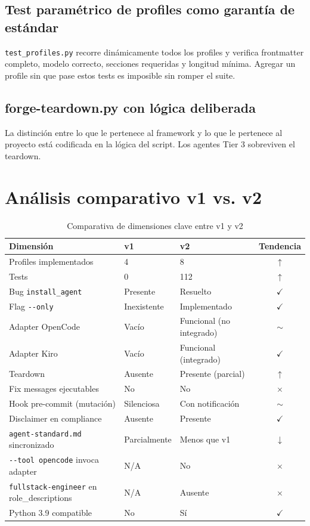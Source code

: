 \documentclass[12pt,a4paper]{article}
\begin{document}
\subsection{Test param\'etrico de profiles como garant\'ia de est\'andar}

\texttt{test\_profiles.py} recorre din\'amicamente todos los profiles y verifica
frontmatter completo, modelo correcto, secciones requeridas y longitud m\'inima.
Agregar un profile sin que pase estos tests es imposible sin romper el suite.

\subsection{forge-teardown.py con l\'ogica deliberada}

La distinci\'on entre lo que le pertenece al framework y lo que le pertenece al
proyecto est\'a codificada en la l\'ogica del script. Los agentes Tier 3
sobreviven el teardown.

\section{An\'alisis comparativo v1 vs. v2}

\begin{table}[h!]
\centering
\caption{Comparativa de dimensiones clave entre v1 y v2}
\begin{tabular}{@{}lllc@{}}
\toprule
\textbf{Dimensi\'on} & \textbf{v1} & \textbf{v2} & \textbf{Tendencia} \\
\midrule
Profiles implementados & 4 & 8 & $\uparrow$ \\
Tests & 0 & 112 & $\uparrow$ \\
Bug \texttt{install\_agent} & Presente & Resuelto & $\checkmark$ \\
Flag \texttt{-{}-only} & Inexistente & Implementado & $\checkmark$ \\
Adapter OpenCode & Vac\'io & Funcional (no integrado) & $\sim$ \\
Adapter Kiro & Vac\'io & Funcional (integrado) & $\checkmark$ \\
Teardown & Ausente & Presente (parcial) & $\uparrow$ \\
Fix messages ejecutables & No & No & $\times$ \\
Hook pre-commit (mutaci\'on) & Silenciosa & Con notificaci\'on & $\sim$ \\
Disclaimer en compliance & Ausente & Presente & $\checkmark$ \\
\texttt{agent-standard.md} sincronizado & Parcialmente & Menos que v1 & $\downarrow$ \\
\texttt{-{}-tool opencode} invoca adapter & N/A & No & $\times$ \\
\texttt{fullstack-engineer} en role\_descriptions & N/A & Ausente & $\times$ \\
Python 3.9 compatible & No & S\'i & $\checkmark$ \\
\bottomrule
\end{tabular}
\end{table}
\end{document}
